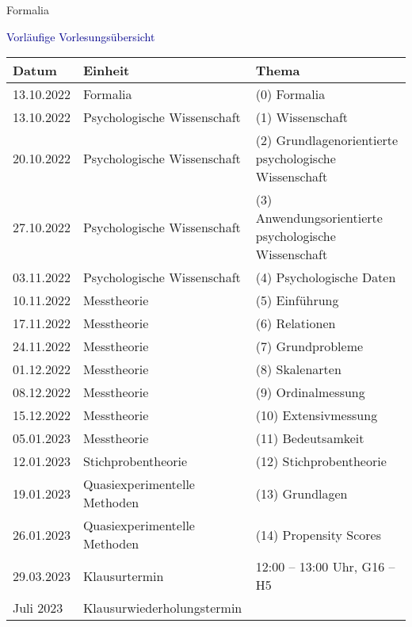 \documentclass[
  8pt,
  ignorenonframetext,
]{beamer}
\begin{document}
\begin{frame}[t]{Formalia}
\protect\hypertarget{formalia}{}
\vspace{1mm}

\textcolor{darkblue}{Vorläufige Vorlesungsübersicht}

\small
\center
\footnotesize
\renewcommand{\arraystretch}{1.1}
\begin{tabular}{lll}
Datum        & Einheit                       & Thema                                                           \\\hline
13.10.2022   & Formalia                      & (0) Formalia                                            \\
13.10.2022   & Psychologische Wissenschaft   & (1) Wissenschaft                                        \\
20.10.2022   & Psychologische Wissenschaft   & (2) Grundlagenorientierte psychologische Wissenschaft   \\
27.10.2022   & Psychologische Wissenschaft   & (3) Anwendungsorientierte psychologische Wissenschaft   \\
03.11.2022   & Psychologische Wissenschaft   & (4) Psychologische Daten                                \\
10.11.2022   & Messtheorie                   & (5) Einführung                                          \\
17.11.2022   & Messtheorie                   & (6) Relationen                                          \\
24.11.2022   & Messtheorie                   & (7) Grundprobleme                                       \\
01.12.2022   & Messtheorie                   & (8) Skalenarten                                         \\
08.12.2022   & Messtheorie                   & (9) Ordinalmessung                                      \\
15.12.2022   & Messtheorie                   & (10) Extensivmessung                                    \\
05.01.2023   & Messtheorie                   & (11) Bedeutsamkeit                                      \\
12.01.2023   & Stichprobentheorie            & (12) Stichprobentheorie                                 \\
19.01.2023   & Quasiexperimentelle Methoden  & (13) Grundlagen                                         \\
26.01.2023   & Quasiexperimentelle Methoden  & (14) Propensity Scores                                  \\\hline
29.03.2023   & Klausurtermin                 & 12:00 – 13:00 Uhr, G16 – H5                             \\
Juli 2023    & Klausurwiederholungstermin    &
\end{tabular}
\end{frame}
\end{document}

